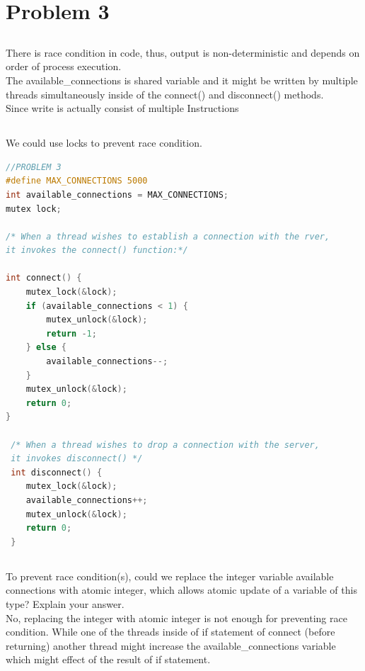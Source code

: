 \documentclass{article}
\begin{document}
\section{Problem 3}

\subsection{}
There is race condition in code, thus, output is non-deterministic and depends on order of process execution.
\\The available\_connections is shared variable and it might be written by multiple threads simultaneously inside of the connect() and disconnect() methods.
\\Since write is actually consist of multiple Instructions 
\subsection{}
We could use locks to prevent race condition.

\begin{lstlisting}[language=C]
//PROBLEM 3
#define MAX_CONNECTIONS 5000
int available_connections = MAX_CONNECTIONS;
mutex lock;

/* When a thread wishes to establish a connection with the rver,
it invokes the connect() function:*/

int connect() {
    mutex_lock(&lock); 
    if (available_connections < 1) {
        mutex_unlock(&lock);
        return -1;
    } else {
        available_connections--;
    }
    mutex_unlock(&lock);
    return 0;
}

 /* When a thread wishes to drop a connection with the server,
 it invokes disconnect() */
 int disconnect() {
    mutex_lock(&lock);
    available_connections++;
    mutex_unlock(&lock);
    return 0;
 }
\end{lstlisting}

\subsection{}To prevent race condition(s), could we replace the integer variable available connections
with atomic integer, which allows atomic update of a variable of this type? Explain your
answer.
\\ No, replacing the integer with atomic integer is not enough for preventing race condition. While one of the threads inside of if statement of connect (before returning) another thread might increase the available\_connections variable which might effect of the result of if statement.
\end{document}
